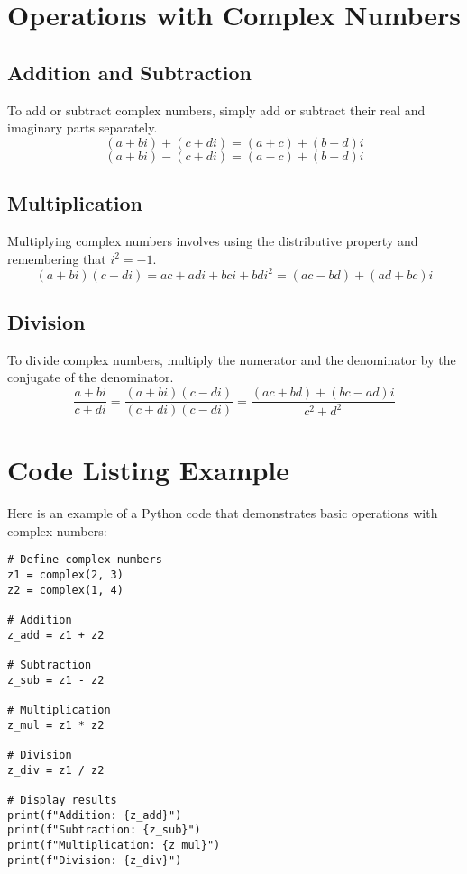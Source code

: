 \documentclass[a4paper,twoside,11pt]{book}
\begin{document}
\section{Operations with Complex Numbers}
\subsection{Addition and Subtraction}
To add or subtract complex numbers, simply add or subtract their real and imaginary parts separately.
\[
(a + bi) + (c + di) = (a + c) + (b + d)i
\]
\[
(a + bi) - (c + di) = (a - c) + (b - d)i
\]

\subsection{Multiplication}
Multiplying complex numbers involves using the distributive property and remembering that \( i^2 = -1 \).
\[
(a + bi)(c + di) = ac + adi + bci + bdi^2 = (ac - bd) + (ad + bc)i
\]

\subsection{Division}
To divide complex numbers, multiply the numerator and the denominator by the conjugate of the denominator.
\[
\frac{a + bi}{c + di} = \frac{(a + bi)(c - di)}{(c + di)(c - di)} = \frac{(ac + bd) + (bc - ad)i}{c^2 + d^2}
\]

\section{Code Listing Example}
Here is an example of a Python code that demonstrates basic operations with complex numbers:

\begin{lstlisting}[style=mystyle, caption={Basic operations with complex numbers in Python}]
# Define complex numbers
z1 = complex(2, 3)
z2 = complex(1, 4)

# Addition
z_add = z1 + z2

# Subtraction
z_sub = z1 - z2

# Multiplication
z_mul = z1 * z2

# Division
z_div = z1 / z2

# Display results
print(f"Addition: {z_add}")
print(f"Subtraction: {z_sub}")
print(f"Multiplication: {z_mul}")
print(f"Division: {z_div}")
\end{lstlisting}

\end{document}
